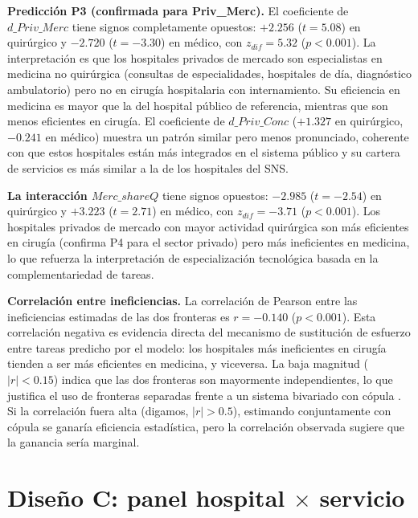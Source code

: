 \documentclass[12pt, a4paper, twoside, openright]{book}
\theoremstyle{plain}
\theoremstyle{definition}
\theoremstyle{remark}
\begin{document}
\textbf{Predicción P3 (confirmada para Priv\_Merc).} El coeficiente de $d\_Priv\_Merc$ tiene signos completamente opuestos: $+2.256$ ($t=5.08$) en quirúrgico y $-2.720$ ($t=-3.30$) en médico, con $z_{dif}=5.32$ ($p<0.001$). La interpretación es que los hospitales privados de mercado son especialistas en medicina no quirúrgica (consultas de especialidades, hospitales de día, diagnóstico ambulatorio) pero no en cirugía hospitalaria con internamiento. Su eficiencia en medicina es mayor que la del hospital público de referencia, mientras que son menos eficientes en cirugía. El coeficiente de $d\_Priv\_Conc$ ($+1.327$ en quirúrgico, $-0.241$ en médico) muestra un patrón similar pero menos pronunciado, coherente con que estos hospitales están más integrados en el sistema público y su cartera de servicios es más similar a la de los hospitales del SNS.

\textbf{La interacción $Merc\_shareQ$} tiene signos opuestos: $-2.985$ ($t=-2.54$) en quirúrgico y $+3.223$ ($t=2.71$) en médico, con $z_{dif}=-3.71$ ($p<0.001$). Los hospitales privados de mercado con mayor actividad quirúrgica son más eficientes en cirugía (confirma P4 para el sector privado) pero más ineficientes en medicina, lo que refuerza la interpretación de especialización tecnológica basada en la complementariedad de tareas.

\textbf{Correlación entre ineficiencias.} La correlación de Pearson entre las ineficiencias estimadas de las dos fronteras es $r=-0.140$ ($p<0.001$). Esta correlación negativa es evidencia directa del mecanismo de sustitución de esfuerzo entre tareas predicho por el modelo: los hospitales más ineficientes en cirugía tienden a ser más eficientes en medicina, y viceversa. La baja magnitud ($|r|<0.15$) indica que las dos fronteras son mayormente independientes, lo que justifica el uso de fronteras separadas frente a un sistema bivariado con cópula \citep{kumbhakar1997}. Si la correlación fuera alta (digamos, $|r|>0.5$), estimando conjuntamente con cópula se ganaría eficiencia estadística, pero la correlación observada sugiere que la ganancia sería marginal.


\section{Diseño C: panel hospital \texorpdfstring{$\times$}{x} servicio}
\end{document}
